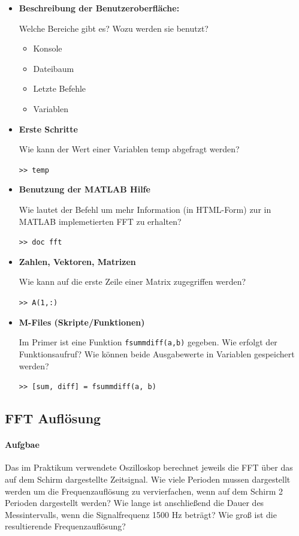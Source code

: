 \documentclass[10pt]{scrreprt}
\begin{document}
        \begin{itemize}
            \item \textbf{Beschreibung der Benutzeroberfläche:}

                Welche Bereiche gibt es? Wozu werden sie benutzt?
                \begin{itemize}
                    \item Konsole
                    \item Dateibaum
                    \item Letzte Befehle
                    \item Variablen
                \end{itemize}
            \item \textbf{Erste Schritte}

                Wie kann der Wert einer Variablen \glqq{}temp\grqq{} abgefragt werden?

                \texttt{>> temp}
            \item \textbf{Benutzung der MATLAB Hilfe}

                Wie lautet der Befehl um mehr Information (in HTML-Form) zur in MATLAB
                implemetierten FFT zu erhalten?

                \texttt{>> doc fft}

            \item \textbf{Zahlen, Vektoren, Matrizen}

                Wie kann auf die erste Zeile einer Matrix zugegriffen werden?

                \texttt{>> A(1,:)}

            \item \textbf{M-Files (Skripte/Funktionen)}

                Im Primer ist eine Funktion \texttt{fsummdiff(a,b)} gegeben. Wie erfolgt der Funktionsaufruf?
                Wie können beide Ausgabewerte in Variablen gespeichert werden?

                \texttt{>> [sum, diff] = fsummdiff(a, b)}

        \end{itemize}

        \subsection{FFT Auflösung}
        \paragraph{Aufgbae}
        Das im Praktikum verwendete Oszilloskop berechnet jeweils die FFT über das auf dem
        Schirm dargestellte Zeitsignal. Wie viele Perioden mussen dargestellt werden um die
        Frequenzauflösung zu vervierfachen, wenn auf dem Schirm 2 Perioden dargestellt werden?
        Wie lange ist anschließend die Dauer des Messintervalls, wenn die Signalfrequenz 1500 Hz
        beträgt? Wie groß ist die resultierende Frequenzauflösung?
\end{document}
